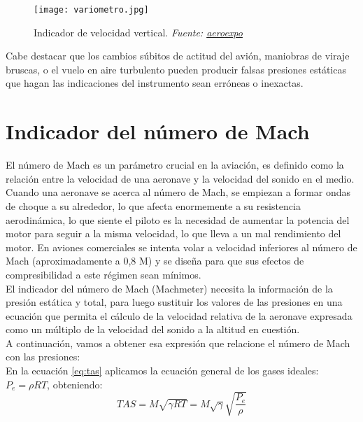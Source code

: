 \begin{figure}[H]
    \centering
    \texttt{[image: variometro.jpg]}
    \caption{Indicador de velocidad vertical. \textit{Fuente: \href{https://www.aeroexpo.online/es/prod/uma-instruments/product-182082-37144.html}{aeroexpo}}}
    \label{fig:placeholder1234}
\end{figure}

Cabe destacar que los cambios súbitos de actitud del avión, maniobras de viraje bruscas, o el vuelo en aire turbulento pueden producir falsas presiones estáticas que hagan las indicaciones del instrumento sean erróneas o inexactas.\\



\section{Indicador del número de Mach}

El número de Mach es un parámetro crucial en la aviación, es definido como la relación entre la velocidad de una aeronave y la velocidad del sonido en el medio.\\

Cuando una aeronave se acerca al número de Mach, se empiezan a formar ondas de choque a su alrededor, lo que afecta enormemente a su resistencia aerodinámica, lo que siente el piloto es la necesidad de aumentar la potencia del motor para seguir a la misma velocidad, lo que lleva a un mal rendimiento del motor. En aviones comerciales se intenta volar a velocidad inferiores al número de Mach (aproximadamente a 0,8 M) y se diseña para que sus efectos de compresibilidad a este régimen sean mínimos.\\


El indicador del número de Mach (Machmeter) necesita la información de la presión estática y total, para luego sustituir los valores de las presiones en una ecuación que permita el cálculo de la velocidad relativa de la aeronave expresada como un múltiplo de la velocidad del sonido a la altitud en cuestión.\\

A continuación, vamos a obtener esa expresión que relacione el número de Mach con las presiones:\\


En la ecuación \ref{eq:tas} aplicamos la ecuación general de los gases ideales: \(P_e = \rho R T\), obteniendo:
\begin{equation}
	TAS = M \sqrt{\gamma R T} = M \sqrt{\gamma} \sqrt{\frac{P_e}{\rho}}
	\label{eq:yeyeyey}
\end{equation}



